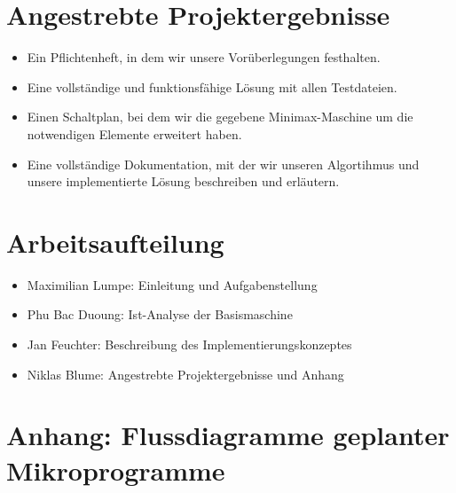 \documentclass[12pt,titlepage,german,a4]{article}
\begin{document}
    \section{Angestrebte Projektergebnisse}
        \begin{itemize}
			\item Ein Pflichtenheft, in dem wir unsere Vor{\"u}berlegungen festhalten.
			\item Eine vollst{\"a}ndige und funktionsf{\"a}hige L{\"o}sung mit allen Testdateien.
			\item Einen Schaltplan, bei dem wir die gegebene Minimax-Maschine um die notwendigen Elemente erweitert haben.
			\item Eine vollst{\"a}ndige Dokumentation, mit der wir unseren Algortihmus und unsere implementierte L{\"o}sung beschreiben und erl{\"a}utern.
        \end{itemize}

	\section{Arbeitsaufteilung}
		\begin{itemize}
			\item Maximilian Lumpe: Einleitung und Aufgabenstellung
			\item Phu Bac Duoung: Ist-Analyse der Basismaschine
			\item Jan Feuchter: Beschreibung des Implementierungskonzeptes
			\item Niklas Blume: Angestrebte Projektergebnisse und Anhang
		\end{itemize}

    \newpage

    \section{Anhang: Flussdiagramme geplanter Mikroprogramme}
\end{document}
